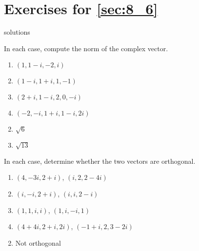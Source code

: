 
\section*{Exercises for \ref{sec:8_6}}

\begin{Filesave}{solutions}
\end{Filesave}

\begin{multicols}{2}
\begin{ex}
In each case, compute the norm of the complex vector.


\begin{enumerate}[label={\alph*.}]
\item $(1, 1 - i, -2, i)$

\item $(1 - i, 1 + i, 1, -1)$

\item $(2 + i, 1 - i, 2, 0, -i)$

\item $(-2, -i, 1 + i, 1 - i, 2i)$

\end{enumerate}
\begin{sol}
\begin{enumerate}[label={\alph*.}]
\setcounter{enumi}{1}
\item  $\sqrt{6}$

\setcounter{enumi}{3}
\item  $\sqrt{13}$

\end{enumerate}
\end{sol}
\end{ex}

\begin{ex}
In each case, determine whether the two vectors are orthogonal.


\begin{enumerate}[label={\alph*.}]
\item $(4, -3i, 2 + i)$, $(i, 2, 2 - 4i)$

\item $(i, -i, 2 + i)$, $(i, i, 2 - i)$

\item $(1, 1, i, i)$, $(1, i, -i, 1)$

\item $(4 + 4i, 2 + i, 2i)$, $(-1 + i, 2, 3 - 2i)$

\end{enumerate}
\begin{sol}
\begin{enumerate}[label={\alph*.}]
\setcounter{enumi}{1}
\item  Not orthogonal


\end{enumerate}
\end{sol}
\end{ex}
\end{multicols}
